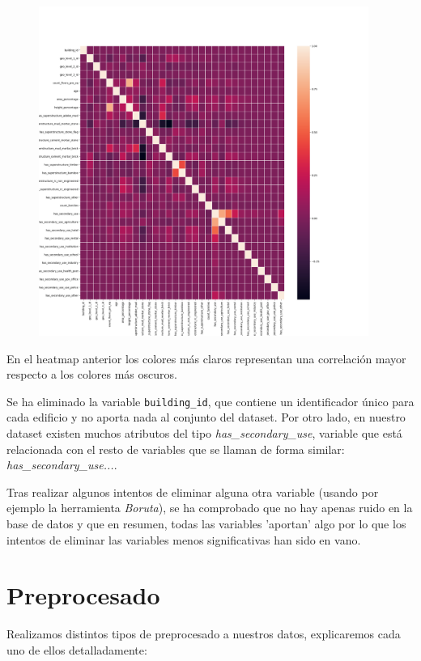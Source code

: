\begin{figure}[H]
	\centering
	\includegraphics[width=0.96\textwidth]{img/corr.png}
\end{figure}

En el heatmap anterior los colores más claros representan una correlación mayor respecto a los colores más oscuros. 


Se ha eliminado la variable \texttt{building\_id}, que contiene un identificador único para cada edificio y no aporta nada al conjunto del dataset. Por otro lado, en nuestro dataset existen muchos atributos del tipo \textit{has\_secondary\_use}, variable que está relacionada con el resto de variables que se llaman de forma similar: \textit{has\_secondary\_use...}.


Tras realizar algunos intentos de eliminar alguna otra variable (usando por ejemplo la herramienta \textit{Boruta}), se ha comprobado que no hay apenas ruido en la base de datos y que en resumen, todas las variables 'aportan' algo por lo que los intentos de eliminar las variables menos significativas han sido en vano.


\section{Preprocesado}

\hspace{1.5cm} Realizamos distintos tipos de preprocesado a nuestros datos, explicaremos cada uno de ellos detalladamente:

